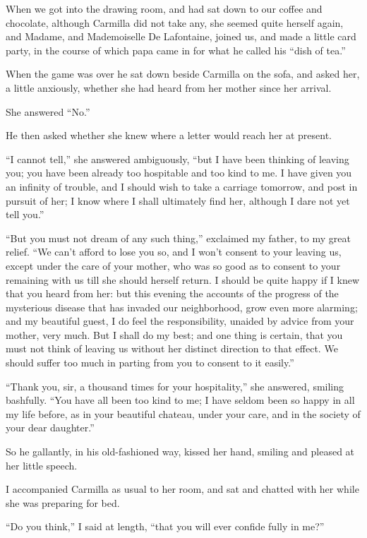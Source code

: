 \documentclass[11pt,twoside,makeidx,hidelinks,]{memoir}
\begin{document}
When we got into the drawing room, and had sat down to our coffee and
chocolate, although Carmilla did not take any, she seemed quite herself
again, and Madame, and Mademoiselle De Lafontaine, joined us, and made a
little card party, in the course of which papa came in for what he
called his ``dish of tea.''

When the game was over he sat down beside Carmilla on the sofa, and
asked her, a little anxiously, whether she had heard from her mother
since her arrival.

She answered ``No.''

He then asked whether she knew where a letter would reach her at
present.

``I cannot tell,'' she answered ambiguously, ``but I have been thinking of
leaving you; you have been already too hospitable and too kind to me. I
have given you an infinity of trouble, and I should wish to take a
carriage tomorrow, and post in pursuit of her; I know where I shall
ultimately find her, although I dare not yet tell you.''

``But you must not dream of any such thing,'' exclaimed my father, to my
great relief. ``We can't afford to lose you so, and I won't consent to
your leaving us, except under the care of your mother, who was so good
as to consent to your remaining with us till she should herself return.
I should be quite happy if I knew that you heard from her: but this
evening the accounts of the progress of the mysterious disease that has
invaded our neighborhood, grow even more alarming; and my beautiful
guest, I do feel the responsibility, unaided by advice from your mother,
very much. But I shall do my best; and one thing is certain, that you
must not think of leaving us without her distinct direction to that
effect. We should suffer too much in parting from you to consent to
it easily.''

``Thank you, sir, a thousand times for your hospitality,'' she answered,
smiling bashfully. ``You have all been too kind to me; I have seldom been
so happy in all my life before, as in your beautiful chateau, under your
care, and in the society of your dear daughter.''

So he gallantly, in his old-fashioned way, kissed her hand, smiling and
pleased at her little speech.

I accompanied Carmilla as usual to her room, and sat and chatted with
her while she was preparing for bed.

``Do you think,'' I said at length, ``that you will ever confide fully in
me?''
\end{document}
